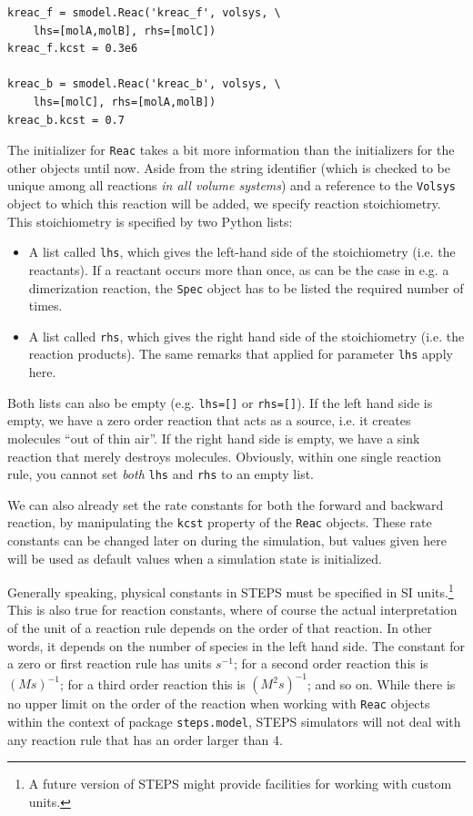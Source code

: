 \documentclass[a4paper,12pt]{book}
\begin{document}
\begin{verbatim}
kreac_f = smodel.Reac('kreac_f', volsys, \
    lhs=[molA,molB], rhs=[molC])
kreac_f.kcst = 0.3e6

kreac_b = smodel.Reac('kreac_b', volsys, \
    lhs=[molC], rhs=[molA,molB])
kreac_b.kcst = 0.7
\end{verbatim}

The initializer for \texttt{Reac} takes a bit more information than the initializers for the other objects until now. Aside from the string identifier (which is checked to be unique among all reactions \emph{in all volume systems}) and a reference to the \texttt{Volsys} object to which this reaction will be added, we specify reaction stoichiometry. This stoichiometry is specified by two Python lists: 

\begin{itemize}
\item
A list called \texttt{lhs}, which gives the left-hand side of the stoichiometry (i.e. the reactants). If a reactant occurs more than once, as can be the case in e.g. a dimerization reaction, the \texttt{Spec} object has to be listed the required number of times.
\item
A list called \texttt{rhs}, which gives the right hand side of the stoichiometry (i.e. the reaction products). The same remarks that applied for parameter \texttt{lhs} apply here.
\end{itemize}

Both lists can also be empty (e.g. \texttt{lhs=[]} or \texttt{rhs=[]}). If the left hand side is empty, we have a zero order reaction that acts as a source, i.e. it creates molecules ``out of thin air''. If the right hand side is empty, we have a sink reaction that merely destroys molecules. Obviously, within one single reaction rule, you cannot set \emph{both} \texttt{lhs} and \texttt{rhs} to an empty list.

We can also already set the rate constants for both the forward and backward reaction, by manipulating the \texttt{kcst} property of the \texttt{Reac} objects. These rate constants can be changed later on during the simulation, but values given here will be used as default values when a simulation state is initialized.

Generally speaking, physical constants in STEPS must be specified in SI units.\footnote{A future version of STEPS might provide facilities for working with custom units.} This is also true for reaction constants, where of course the actual interpretation of the unit of a reaction rule depends on the order of that reaction. In other words, it depends on the number of species in the left hand side. The constant for a zero or first reaction rule has units $s^{-1}$; for a second order reaction this is $(Ms)^{-1}$; for a third order reaction this is $(M^2s)^{-1}$; and so on. While there is no upper limit on the order of the reaction when working with \texttt{Reac} objects within the context of package \texttt{steps.model}, STEPS simulators will not deal with any reaction rule that has an order larger than 4. 
\end{document}

